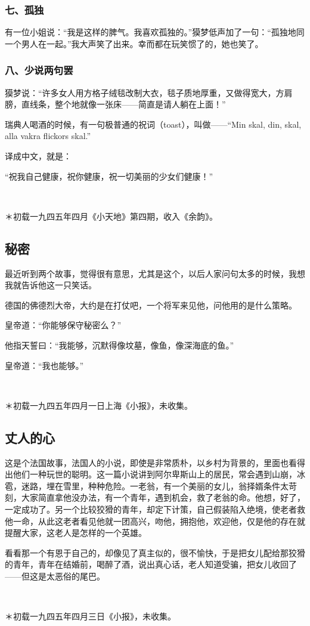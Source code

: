 \subsubsection*{七、孤独}
\par 有一位小姐说：“我是这样的脾气。我喜欢孤独的。”獏梦低声加了一句：“孤独地同一个男人在一起。”我大声笑了出来。幸而都在玩笑惯了的，她也笑了。
\subsubsection*{八、少说两句罢}
\par 獏梦说：“许多女人用方格子绒毯改制大衣，毯子质地厚重，又做得宽大，方肩膀，直线条，整个地就像一张床——简直是请人躺在上面！”
\par 瑞典人喝酒的时候，有一句极普通的祝词（toast），叫做——“Min skal, din, skal, alla vakra flickors skal.”
\par 译成中文，就是：
\par “祝我自己健康，祝你健康，祝一切美丽的少女们健康！”
\par  
\par ＊初载一九四五年四月《小天地》第四期，收入《余韵》。


\subsection{秘密}

\par 最近听到两个故事，觉得很有意思，尤其是这个，以后人家问句太多的时候，我想我就告诉他这一只笑话。
\par 德国的佛德烈大帝，大约是在打仗吧，一个将军来见他，问他用的是什么策略。
\par 皇帝道：“你能够保守秘密么？”
\par 他指天誓曰：“我能够，沉默得像坟墓，像鱼，像深海底的鱼。”
\par 皇帝道：“我也能够。”
\par  
\par ＊初载一九四五年四月一日上海《小报》，未收集。


\subsection{丈人的心}

\par 这是个法国故事，法国人的小说，即使是非常质朴，以乡村为背景的，里面也看得出他们一种玩世的聪明。这一篇小说讲到阿尔卑斯山上的居民，常会遇到山崩，冰雹，迷路，埋在雪里，种种危险。一老翁，有一个美丽的女儿，翁择婿条件太苛刻，大家简直拿他没办法，有一个青年，遇到机会，救了老翁的命。他想，好了，一定成功了。另一个比较狡猾的青年，却定下计策，自己假装陷入绝境，使老者救他一命，从此这老者看见他就一团高兴，吻他，拥抱他，欢迎他，仅是他的存在就提醒大家，这老人是怎样的一个英雄。
\par 看看那一个有恩于自己的，却像见了真主似的，很不愉快，于是把女儿配给那狡猾的青年，青年在结婚前，喝醉了酒，说出真心话，老人知道受骗，把女儿收回了——但这是太恶俗的尾巴。
\par  
\par ＊初载一九四五年四月三日《小报》，未收集。


